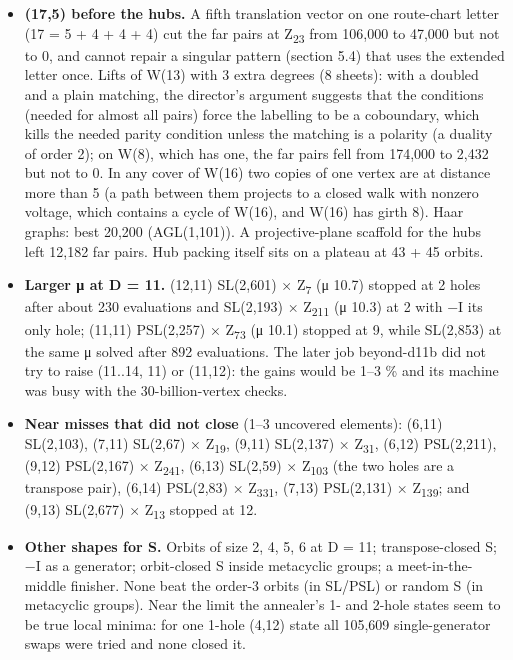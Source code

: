 \documentclass[
  10pt,
]{article}
\providecommand{\tightlist}{%
  \setlength{\itemsep}{0pt}\setlength{\parskip}{0pt}}
\begin{document}
\begin{itemize}
\tightlist
\item
  \textbf{(17,5) before the hubs.} A fifth translation vector on one route-chart letter (17 = 5 + 4 + 4 + 4) cut the
  far pairs at Z\textsubscript{23} from 106,000 to 47,000 but not to 0, and cannot repair a singular pattern (section
  5.4) that uses the extended letter once. Lifts of W(13) with 3 extra degrees (8 sheets): with a doubled and a plain
  matching, the director's argument suggests that the conditions (needed for almost all pairs) force the labelling to
  be a coboundary, which kills the needed parity condition unless the matching is a polarity (a duality of order 2);
  on W(8), which has one, the far pairs fell from 174,000 to 2,432 but not to 0. In any cover of W(16) two copies of
  one vertex are at distance more than 5 (a path between them projects to a closed walk with nonzero voltage, which
  contains a cycle of W(16), and W(16) has girth 8). Haar graphs: best 20,200 (AGL(1,101)). A projective-plane
  scaffold for the hubs left 12,182 far pairs. Hub packing itself sits on a plateau at 43 + 45 orbits.
\item
  \textbf{Larger μ at D = 11.} (12,11) SL(2,601) × Z\textsubscript{7} (μ 10.7) stopped at 2 holes after about 230
  evaluations and SL(2,193) × Z\textsubscript{211} (μ 10.3) at 2 with −I its only hole; (11,11) PSL(2,257) ×
  Z\textsubscript{73} (μ 10.1) stopped at 9, while SL(2,853) at the same μ solved after 892 evaluations. The later job
  beyond-d11b did not try to raise (11..14, 11) or (11,12): the gains would be 1--3 \% and its machine was busy with
  the 30-billion-vertex checks.
\item
  \textbf{Near misses that did not close} (1--3 uncovered elements): (6,11) SL(2,103), (7,11) SL(2,67) ×
  Z\textsubscript{19}, (9,11) SL(2,137) × Z\textsubscript{31}, (6,12) PSL(2,211), (9,12) PSL(2,167) ×
  Z\textsubscript{241}, (6,13) SL(2,59) × Z\textsubscript{103} (the two holes are a transpose pair), (6,14) PSL(2,83)
  × Z\textsubscript{331}, (7,13) PSL(2,131) × Z\textsubscript{139}; and (9,13) SL(2,677) × Z\textsubscript{13} stopped
  at 12.
\item
  \textbf{Other shapes for S.} Orbits of size 2, 4, 5, 6 at D = 11; transpose-closed S; −I as a generator;
  orbit-closed S inside metacyclic groups; a meet-in-the-middle finisher. None beat the order-3 orbits (in SL/PSL) or
  random S (in metacyclic groups). Near the limit the annealer's 1- and 2-hole states seem to be true local minima:
  for one 1-hole (4,12) state all 105,609 single-generator swaps were tried and none closed it.

\end{itemize}
\end{document}
